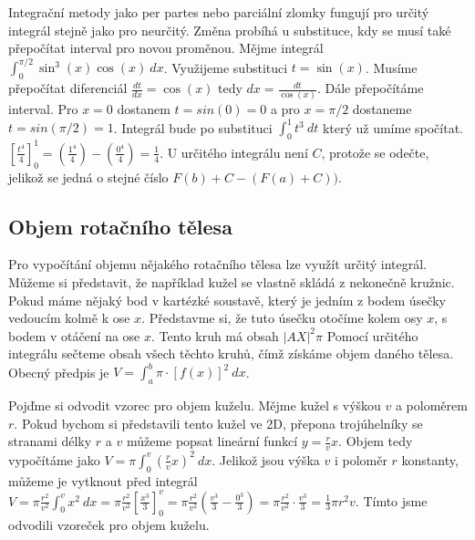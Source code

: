\documentclass[12pt]{article}
\begin{document}
Integrační metody jako per partes nebo parciální zlomky fungují pro určitý integrál stejně jako
pro neurčitý. Změna probíhá u substituce, kdy se musí také přepočítat interval pro novou proměnou.
Mějme integrál $\int_{0}^{\pi / 2} \sin^3(x) \cos(x) \ dx$. Využijeme substituci $t = \sin(x)$.
Musíme přepočítat diferenciál $\frac{dt}{dx} = \cos(x)$ tedy $dx = \frac{dt}{\cos(x)}$. Dále
přepočítáme interval. Pro $x = 0$ dostanem $t = sin(0) = 0$ a pro $x = \pi/2$ dostaneme $t = sin(\pi
/2) = 1$. Integrál bude po substituci $\int_{0}^{1} t^3 \ dt$ který už umíme spočítat. $\left[\frac
{t^4}{4}\right]_{0}^{1} = (\frac{1^4}{4}) - (\frac{0^4}{4}) = \frac{1}{4}$. U určitého integrálu
není $C$, protože se odečte, jelikož se jedná o stejné číslo $F(b) + C - (F(a) + C))$.

\subsection*{Objem rotačního tělesa}
Pro vypočítání objemu nějakého rotačního tělesa lze využít určitý integrál. Můžeme si představit,
že například kužel se vlastně skládá z nekonečně kružnic. Pokud máme nějaký bod v kartézké soustavě,
který je jedním z bodem úsečky vedoucím kolmě k ose $x$. Představme si, že tuto úsečku otočíme kolem
osy $x$, s bodem v otáčení na ose $x$. Tento kruh má obsah $|AX|^2 \pi$ Pomocí určitého integrálu
sečteme obsah všech těchto kruhů, čímž získáme objem daného tělesa. Obecný předpis je $V =
\int_{a}^{b} \pi \cdot \left[f(x)\right]^2 \ dx$. 

Pojďme si odvodit vzorec pro objem kuželu. Mějme kužel s výškou $v$ a poloměrem $r$. Pokud bychom
si představili tento kužel ve 2D, přepona trojúhelníky se stranami délky $r$ a $v$ můžeme popsat
lineární funkcí $y = \frac{r}{v}x$.
Objem tedy vypočítáme jako $V = \pi \int_{0}^{v} (\frac{r}{v}x)^2 \ dx$. Jelikož jsou výška $v$ i
poloměr $r$ konstanty, můžeme je vytknout před integrál $V = \pi \frac{r^2}{v^2} \int_{0}^{v} x^2
\ dx = \pi \frac{r^2}{v^2} \left[\frac{x^3}{3}\right]_{0}^{v} = \pi \frac{r^2}{v^2}(\frac{v^3}{3} -
\frac{0^3}{3}) = \pi \frac{r^2}{v^2} \cdot \frac{v^3}{3} = \frac{1}{3} \pi r^2 v$. Tímto jsme
odvodili vzoreček pro objem kuželu.
\end{document}
